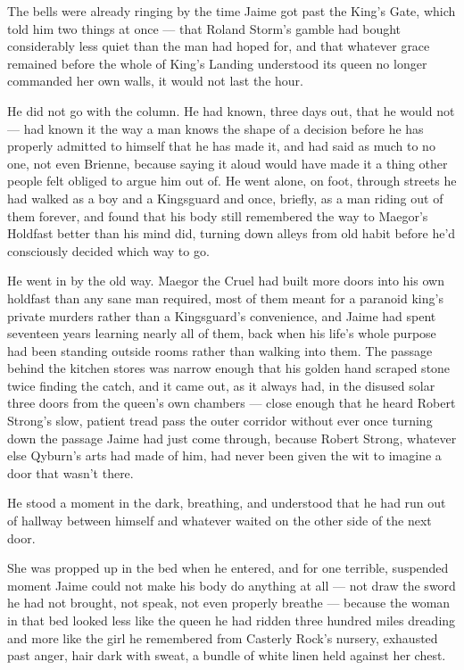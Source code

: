 The bells were already ringing by the time Jaime got past the King’s Gate, which told him two things at once — that Roland Storm’s gamble had bought considerably less quiet than the man had hoped for, and that whatever grace remained before the whole of King’s Landing understood its queen no longer commanded her own walls, it would not last the hour.

He did not go with the column. He had known, three days out, that he would not — had known it the way a man knows the shape of a decision before he has properly admitted to himself that he has made it, and had said as much to no one, not even Brienne, because saying it aloud would have made it a thing other people felt obliged to argue him out of. He went alone, on foot, through streets he had walked as a boy and a Kingsguard and once, briefly, as a man riding out of them forever, and found that his body still remembered the way to Maegor’s Holdfast better than his mind did, turning down alleys from old habit before he’d consciously decided which way to go.

He went in by the old way. Maegor the Cruel had built more doors into his own holdfast than any sane man required, most of them meant for a paranoid king’s private murders rather than a Kingsguard’s convenience, and Jaime had spent seventeen years learning nearly all of them, back when his life’s whole purpose had been standing outside rooms rather than walking into them. The passage behind the kitchen stores was narrow enough that his golden hand scraped stone twice finding the catch, and it came out, as it always had, in the disused solar three doors from the queen’s own chambers — close enough that he heard Robert Strong’s slow, patient tread pass the outer corridor without ever once turning down the passage Jaime had just come through, because Robert Strong, whatever else Qyburn’s arts had made of him, had never been given the wit to imagine a door that wasn’t there.

He stood a moment in the dark, breathing, and understood that he had run out of hallway between himself and whatever waited on the other side of the next door.

\sceneBreak

She was propped up in the bed when he entered, and for one terrible, suspended moment Jaime could not make his body do anything at all — not draw the sword he had not brought, not speak, not even properly breathe — because the woman in that bed looked less like the queen he had ridden three hundred miles dreading and more like the girl he remembered from Casterly Rock’s nursery, exhausted past anger, hair dark with sweat, a bundle of white linen held against her chest.

